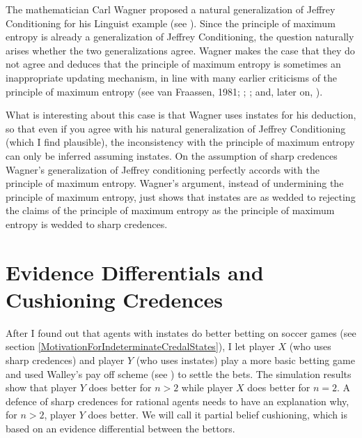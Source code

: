 \documentclass[11pt]{article}
\begin{document}
The mathematician Carl Wagner proposed a natural generalization of
Jeffrey Conditioning for his Linguist example (see
). Since the principle of maximum entropy is
already a generalization of Jeffrey Conditioning, the question
naturally arises whether the two generalizations agree. Wagner makes
the case that they do not agree and deduces that the principle of
maximum entropy is sometimes an inappropriate updating mechanism, in
line with many earlier criticisms of the principle of maximum entropy
(see van Fraassen, 1981; ;
; and, later on,
).

What is interesting about this case is that Wagner uses instates for
his deduction, so that even if you agree with his natural
generalization of Jeffrey Conditioning (which I find plausible), the
inconsistency with the principle of maximum entropy can only be
inferred assuming instates. On the assumption of sharp credences
Wagner's generalization of Jeffrey conditioning perfectly accords with
the principle of maximum entropy. Wagner's argument, instead of
undermining the principle of maximum entropy, just shows that instates
are as wedded to rejecting the claims of the principle of maximum
entropy as the principle of maximum entropy is wedded to sharp
credences.

\section{Evidence Differentials and Cushioning Credences}
\label{WalleysWorldCupWoes}

After I found out that agents with instates do better betting on
soccer games (see section
\ref{MotivationForIndeterminateCredalStates}), I let player $X$ (who
uses sharp credences) and player $Y$ (who uses instates) play a more
basic betting game and used Walley's pay off scheme (see
) to settle the bets. The simulation results
show that player $Y$ does better for $n>2$ while player $X$ does
better for $n=2$. A defence of sharp credences for rational agents
needs to have an explanation why, for $n>2$, player $Y$ does better.
We will call it partial belief cushioning, which is based on an
evidence differential between the bettors.
\end{document}
